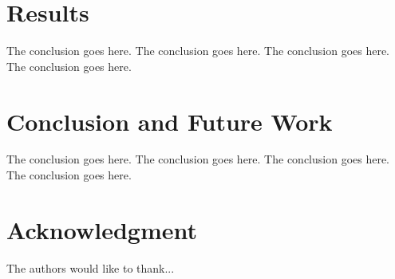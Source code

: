 \documentclass[10pt,conference,compsocconf]{IEEEtran}
\begin{document}
\section{Results}
The conclusion goes here.
The conclusion goes here.
The conclusion goes here.
The conclusion goes here.

\section{Conclusion and Future Work}
The conclusion goes here.
The conclusion goes here.
The conclusion goes here.
The conclusion goes here.






\section*{Acknowledgment}


The authors would like to thank...







%
%
%
%
%




\end{document}
